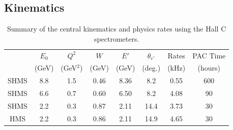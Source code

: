 \subsection{Kinematics}
\begin{table}
\begin{center}
\begin{tabular}{c|c|c|c|c|c|c|c}
& $E_0$ & $Q^2$    &  $W$  	& $E'$  &    $\theta_{e'}$  &  Rates   & PAC Time   \\
& (GeV) & (GeV$^2$)  			& (GeV) 			& (GeV)  &     (deg.)   &   (kHz)  & (hours) \\
\hline\hline
SHMS & 8.8	&  1.5	&  0.46	&  8.36	&    8.2 	&    0.55	&   600 \\
SHMS & 6.6	&  0.7	&  0.60	&  6.50	&    8.2 	&    4.08	&   90 \\
SHMS & 2.2	&  0.3	&  0.87	&  2.11	&    14.4 	&    3.73	&   30 \\
HMS  & 2.2	&  0.3	&  0.86	&  2.11	&    14.9	&    4.65	&   30 \\  

\hline\hline
\end{tabular}
\caption{\label{RATES1}Summary of the central kinematics and physics rates using the Hall C  spectrometers.}
\end{center}
\end{table}


